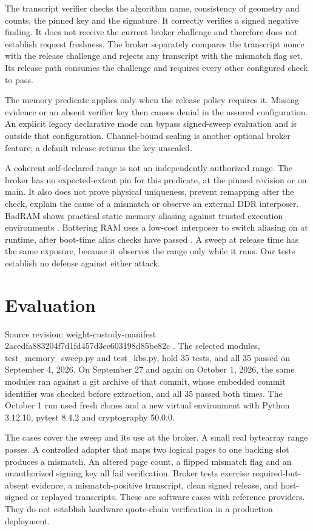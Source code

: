 \documentclass[10pt,letterpaper]{article}
\let\plainsection\section
\renewcommand{\section}{\Needspace{6\baselineskip}\plainsection}
\begin{document}
The transcript verifier checks the algorithm name, consistency of geometry and counts, the pinned key and the signature. It correctly verifies a signed negative finding. It does not receive the current broker challenge and therefore does not establish request freshness. The broker separately compares the transcript nonce with the release challenge and rejects any transcript with the mismatch flag set. Its release path consumes the challenge and requires every other configured check to pass.


The memory predicate applies only when the release policy requires it. Missing evidence or an absent verifier key then causes denial in the assured configuration. An explicit legacy declarative mode can bypass signed-sweep evaluation and is outside that configuration. Channel-bound sealing is another optional broker feature; a default release returns the key unsealed.


A coherent self-declared range is not an independently authorized range. The broker has no expected-extent pin for this predicate, at the pinned revision or on main. It also does not prove physical uniqueness, prevent remapping after the check, explain the cause of a mismatch or observe an external DDR interposer. BadRAM shows practical static memory aliasing against trusted execution environments \cite{ref4}. Battering RAM uses a low-cost interposer to switch aliasing on at runtime, after boot-time alias checks have passed \cite{ref8}. A sweep at release time has the same exposure, because it observes the range only while it runs. Our tests establish no defense against either attack.


\section{Evaluation}

Source revision: weight-custody-manifest 2acedfa883204f7d1fd457d3ee603198d85be82c \cite{ref5}. The selected modules, test\_memory\_sweep.py and test\_kbs.py, hold 35 tests, and all 35 passed on September 4, 2026. On September 27 and again on October 1, 2026, the same modules ran against a git archive of that commit, whose embedded commit identifier was checked before extraction, and all 35 passed both times. The October 1 run used fresh clones and a new virtual environment with Python 3.12.10, pytest 8.4.2 and cryptography 50.0.0.


The cases cover the sweep and its use at the broker. A small real bytearray range passes. A controlled adapter that maps two logical pages to one backing slot produces a mismatch. An altered page count, a flipped mismatch flag and an unauthorized signing key all fail verification. Broker tests exercise required-but-absent evidence, a mismatch-positive transcript, clean signed release, and host-signed or replayed transcripts. These are software cases with reference providers. They do not establish hardware quote-chain verification in a production deployment.
\end{document}

